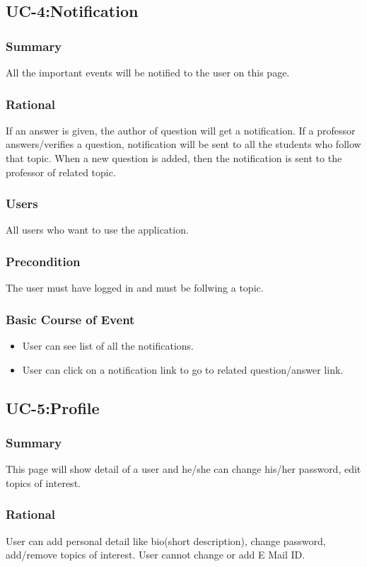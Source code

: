 \documentclass[12pt]{article}
\begin{document}
\subsection{UC-4:Notification}
\subsubsection{Summary}
All the important events will be notified to the user on this page.
\subsubsection{Rational}
If an answer is given, the author of question will get a notification. If a professor answers/verifies a question, notification will be sent to all the students who follow that topic. When a new question is added, then the notification is sent to the professor of related topic.
\subsubsection{Users}
All users who want to use the application.
\subsubsection{Precondition}
The user must have logged in and must be follwing a topic.
\subsubsection{Basic Course of Event}
\begin{itemize}
\item User can see list of all the notifications.
\item User can click on a notification link to go to related question/answer link.
\end{itemize}

\subsection{UC-5:Profile}
\subsubsection{Summary}
This page will show detail of a user and he/she can change his/her password, edit topics of interest.
\subsubsection{Rational}
User can add personal detail like bio(short description), change password, add/remove topics of interest. User cannot change or add E Mail ID.
\end{document}
